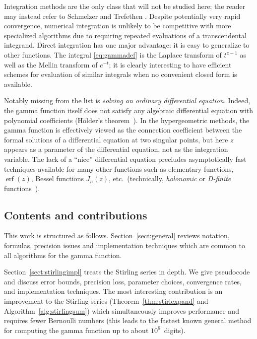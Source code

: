 \documentclass[reqno]{amsart}
\theoremstyle{definition}
\begin{document}
Integration methods
are the only class that will not be studied here; the reader may
instead refer to Schmelzer and Trefethen \cite{schmelzer2007computing}.
Despite potentially very rapid convergence, numerical
integration is unlikely to be competitive
with more specialized algorithms
due to requiring repeated evaluations of a transcendental integrand.
Direct integration has one major advantage:
it is easy to generalize to other functions.
The integral \eqref{eq:gammadef} is the Laplace
transform of $t^{z-1}$ as well as the Mellin transform
of $e^{-t}$;
it is clearly interesting to have efficient schemes for
evaluation of similar integrals when no convenient closed form is available.

Notably missing from the list is \emph{solving an ordinary differential equation}.
Indeed, the gamma function itself does not satisfy any algebraic differential equation with polynomial
coefficients (H\"older's theorem~\cite{holder1886ueber}).
In the hypergeometric methods, the gamma function is effectively
viewed as the connection coefficient
between the formal solutions
of a differential equation at two singular points, but here $z$ appears as a parameter of the differential
equation, not as the integration variable.
The lack of a ``nice'' differential equation precludes asymptotically fast techniques available for many
other functions such as elementary functions, $\operatorname{erf}(z)$, Bessel functions $J_n(z)$, etc.\ (technically, \emph{holonomic} or \emph{D-finite} functions~\cite{vdH:hol,Mezzarobba2011}).

\subsection{Contents and contributions}

This work is structured as follows.
Section~\ref{sect:general} reviews notation,
formulas, precision issues and implementation
techniques which are common to all algorithms for the gamma function.

Section~\ref{sect:stirlingimpl} treats the Stirling series in depth.
We give pseudocode and discuss error bounds, precision loss,
parameter choices, convergence rates, and implementation techniques.
The most interesting contribution is an improvement to
the Stirling series (Theorem~\ref{thm:stirlexpand} and Algorithm~\ref{alg:stirlingsum})
which simultaneously improves performance and requires
fewer Bernoulli numbers
(this leads to the fastest
known general method for computing the gamma function
up to about $10^6$~digits).
\end{document}
